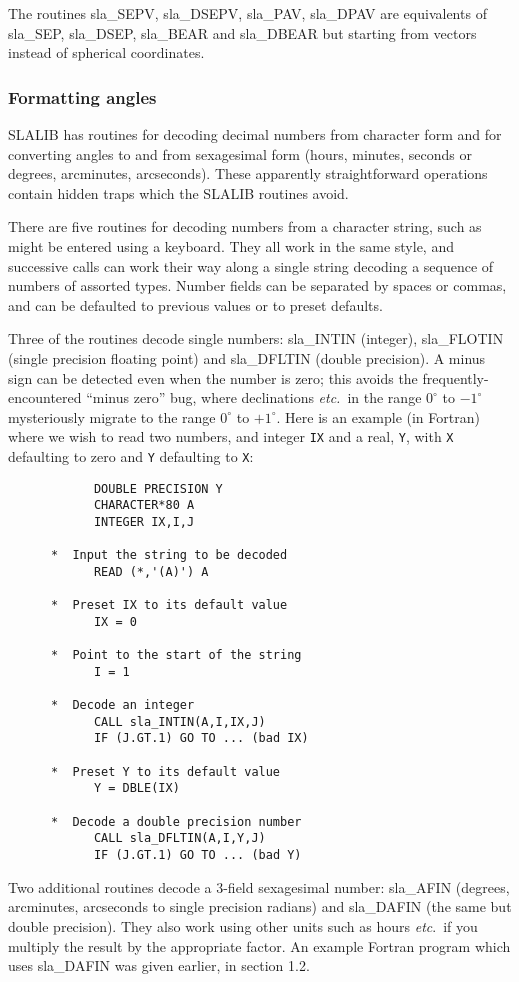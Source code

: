 \documentclass[11pt,twoside]{article}
\begin{document}
The routines
sla\_SEPV,
sla\_DSEPV,
sla\_PAV,
sla\_DPAV
are equivalents of sla\_SEP, sla\_DSEP, sla\_BEAR and sla\_DBEAR
but starting from vectors
instead of spherical coordinates.

\subsubsection{Formatting angles}
SLALIB has routines for decoding decimal numbers
from character form and for converting angles to and from
sexagesimal form (hours, minutes, seconds or degrees,
arcminutes, arcseconds).  These apparently straightforward
operations contain hidden traps which the SLALIB routines
avoid.

There are five routines for decoding numbers from a character
string, such as might be entered using a keyboard.
They all work in the same style, and successive calls
can work their way along a single string decoding
a sequence of numbers of assorted types.  Number
fields can be separated by spaces or commas, and can be defaulted
to previous values or to preset defaults.

Three of the routines decode single numbers:
sla\_INTIN
(integer),
sla\_FLOTIN
(single precision floating point) and
sla\_DFLTIN
(double precision).  A minus sign can be
detected even when the number is zero;  this avoids
the frequently-encountered ``minus zero'' bug, where
declinations {\it etc.}\ in
the range $0^{\circ}$ to $-1^{\circ}$ mysteriously migrate to
the range $0^{\circ}$ to $+1^{\circ}$.
Here is an example (in Fortran) where we wish to
read two numbers, and integer {\tt IX} and a real, {\tt Y},
with {\tt X} defaulting to zero and {\tt Y} defaulting to
{\tt X}:
\goodbreak
\begin{verbatim}
            DOUBLE PRECISION Y
            CHARACTER*80 A
            INTEGER IX,I,J

      *  Input the string to be decoded
            READ (*,'(A)') A

      *  Preset IX to its default value
            IX = 0

      *  Point to the start of the string
            I = 1

      *  Decode an integer
            CALL sla_INTIN(A,I,IX,J)
            IF (J.GT.1) GO TO ... (bad IX)

      *  Preset Y to its default value
            Y = DBLE(IX)

      *  Decode a double precision number
            CALL sla_DFLTIN(A,I,Y,J)
            IF (J.GT.1) GO TO ... (bad Y)
\end{verbatim}
\goodbreak
Two additional routines decode a 3-field sexagesimal number:
sla\_AFIN
(degrees, arcminutes, arcseconds to single
precision radians) and
sla\_DAFIN
(the same but double precision).  They also
work using other units such as hours {\it etc}.\ if
you multiply the result by the appropriate factor.  An example
Fortran program which uses
sla\_DAFIN
was given earlier, in section 1.2.
\end{document}
